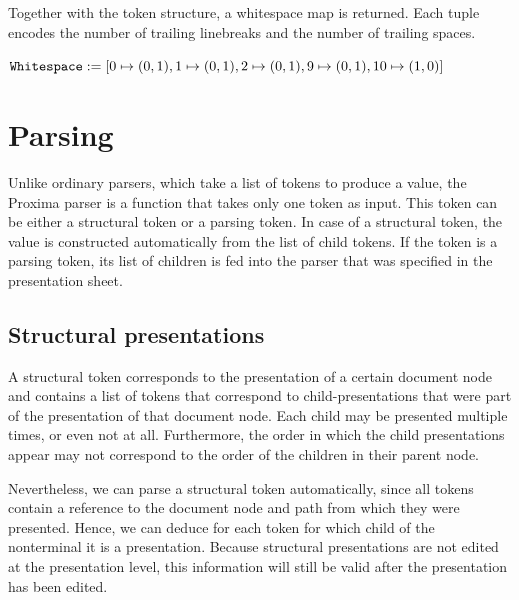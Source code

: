 \documentclass[12pt]{article}
\begin{document}
Together with the token structure, a whitespace map is returned. Each tuple encodes the number of trailing linebreaks and the number of trailing spaces. 

\noindent \begin{math}
\texttt{Whitespace}: =[ 0 \mapsto (0,1), 1 \mapsto (0,1), 2 \mapsto (0,1), 9 \mapsto (0,1), 10 \mapsto (1,0) ]
\end{math}






%
\section{Parsing}\label{sect:parser}
%

Unlike ordinary parsers, which take a list of tokens to produce a value, the Proxima parser is a function that takes only one token as input. This token can be either a structural token or a parsing token. In case of a structural token, the value is constructed automatically from the list of child tokens. If the token is a parsing token, its list of children is fed into the parser that was specified in the presentation sheet.

\subsection{Structural presentations}\label{subsect:parsingStructural}

A structural token corresponds to the presentation of a certain document node and contains a list of tokens that correspond to child-presentations that were part of the presentation of that document node. Each child may be presented multiple times, or even not at all. Furthermore, the order in which the child presentations appear may not correspond to the order of the children in their parent node.

Nevertheless, we can parse a structural token automatically, since all tokens contain a  reference to the document node and path from which they were presented. Hence, we can deduce for each token for which child of the nonterminal it is a presentation. Because structural presentations are not edited at the presentation level, this information will still be valid after the presentation has been edited. 
\end{document}
